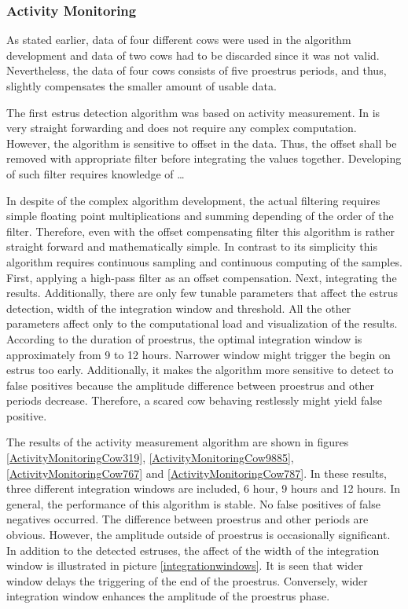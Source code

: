 \documentclass[english,12pt,a4paper,pdftex,elec,utf8]{aaltothesis}
\begin{document}
\subsubsection{Activity Monitoring} \label{activitymeasurementevaluation}






As stated earlier, data of four different cows were used in the algorithm development and data of two cows had to be discarded since it was not valid. Nevertheless, the data of four cows consists of five proestrus periods, and thus, slightly compensates the smaller amount of usable data.

The first estrus detection algorithm was based on activity measurement. In is very straight forwarding and does not require any complex computation. However, the algorithm is sensitive to offset in the data. Thus, the offset shall be removed with appropriate filter before integrating the values together. Developing of such filter requires knowledge of \dots

In despite of the complex algorithm development, the actual filtering requires simple floating point multiplications and summing depending of the order of the filter. Therefore, even with the offset compensating filter this algorithm is rather straight forward and mathematically simple. In contrast to its simplicity this algorithm requires continuous sampling and continuous computing of the samples. First, applying a high-pass filter as an offset compensation. Next, integrating the results. Additionally, there are only few tunable parameters that affect the estrus detection, width of the integration window and threshold. All the other parameters affect only to the computational load and visualization of the results.\\

According to the duration of proestrus, the optimal integration window is approximately from 9 to 12 hours. Narrower window might trigger the begin on estrus too early. Additionally, it makes the algorithm more sensitive to detect to false positives because the amplitude difference between proestrus and other periods decrease. Therefore, a scared cow behaving restlessly might yield false positive.

The results of the activity measurement algorithm are shown in figures \ref{ActivityMonitoringCow319}, \ref{ActivityMonitoringCow9885}, \ref{ActivityMonitoringCow767} and \ref{ActivityMonitoringCow787}. In these results, three different integration windows are included, 6 hour, 9 hours and 12 hours. In general, the performance of this algorithm is stable. No false positives of false negatives occurred. The difference between proestrus and other periods are obvious. However, the amplitude outside of proestrus is occasionally significant. In addition to the detected estruses, the affect of the width of the integration window is illustrated in picture \ref{integrationwindows}. It is seen that wider window delays the triggering of the end of the proestrus. Conversely, wider integration window enhances the amplitude of the proestrus phase. 
\end{document}
